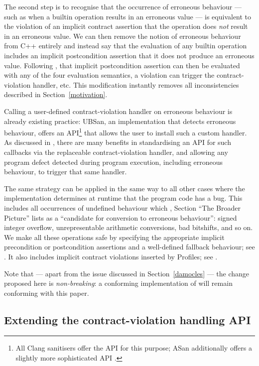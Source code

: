 The second step is to recognise that the occurrence of erroneous behaviour --- such as when a builtin operation results in an erroneous value --- is equivalent to the violation of an implicit contract assertion that the operation does \emph{not} result in an erroneous value. We can then remove the notion of erroneous behaviour from C++ entirely and instead say that the evaluation of any builtin operation includes an implicit postcondition assertion that it does not produce an erroneous value. Following \cite{P2900R13}, that implicit postcondition assertion can then be evaluated with any of the four evaluation semantics, a violation can trigger the contract-violation handler, etc. This modification instantly removes all inconsistencies described in Section~\ref{motivation}.

Calling a user-defined contract-violation handler on erroneous behaviour is already existing practice: UBSan, an implementation that detects erroneous behaviour, offers an API\footnote{All Clang sanitisers offer the API  for this purpose; ASan additionally offers a slightly more sophisticated API .} that allows the user to install such a custom handler. As discussed in \cite{P3100R1}, there are many benefits in standardising an API for such callbacks via the replaceable contract-violation handler, and allowing any program defect detected during program execution, including erroneous behaviour, to trigger that same handler.

The same strategy can be applied in the same way to all other cases where the implementation determines at runtime that the program code has a bug. This includes all occurrences of undefined behaviour which \cite{P2795R5}, Section ``The Broader Picture'' lists as a ``candidate for conversion to erroneous behaviour'': signed integer overflow, unrepresentable arithmetic conversions, bad bitshifts, and so on. We make all these operations safe by specifying the appropriate implicit precondition or postcondition assertions and a well-defined fallback behaviour; see \cite{P3100R1}. It also includes implicit contract violations inserted by Profiles; see \cite{P3081R1}.

Note that --- apart from the issue discussed in Section~\ref{damocles} --- the change proposed here is \emph{non-breaking}: a conforming implementation of \cite{P2795R5} will remain conforming with this paper.

\subsection{Extending the contract-violation handling API}

